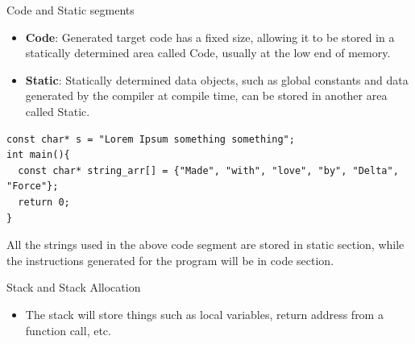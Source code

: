 \documentclass[
  10pt,
  ignorenonframetext,
]{beamer}
\providecommand{\tightlist}{%
  \setlength{\itemsep}{0pt}\setlength{\parskip}{0pt}}
\begin{document}
\begin{frame}[fragile]{Code and Static segments}
\protect\hypertarget{code-and-static-segments}{}
\begin{itemize}
\tightlist
\item
  \textbf{Code}: Generated target code has a fixed
  size, allowing it to be stored in a statically
  determined area called Code, usually at the low
  end of memory.
\end{itemize}

\pause

\begin{itemize}
\tightlist
\item
  \textbf{Static}: Statically determined data
  objects, such as global constants and data
  generated by the compiler at compile time, can
  be stored in another area called Static.
\end{itemize}

\pause

\begin{verbatim}
const char* s = "Lorem Ipsum something something";
int main(){
  const char* string_arr[] = {"Made", "with", "love", "by", "Delta", "Force"};
  return 0;
}
\end{verbatim}

All the strings used in the above code segment are
stored in static section, while the instructions
generated for the program will be in code section.
\end{frame}

\begin{frame}{Stack and Stack Allocation}
\protect\hypertarget{stack-and-stack-allocation}{}
\pause

\begin{itemize}
\tightlist
\item
  The stack will store things such as local
  variables, return address from a function call,
  etc.
\end{itemize}
\end{frame}
\end{document}
